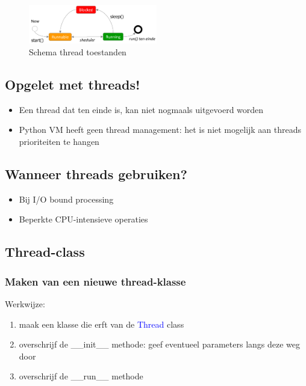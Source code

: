 \documentclass{article}
\begin{document}
\begin{figure}[H]
    \centering
    \includegraphics[width=0.5\textwidth]{thread-toestanden.png}
    \caption{Schema thread toestanden}
\end{figure}


\subsection{Opgelet met threads!}

\begin{itemize}
    \item Een thread dat ten einde is, kan niet nogmaals uitgevoerd worden
    \item Python VM heeft geen thread management: het is niet mogelijk aan threads prioriteiten te hangen
\end{itemize}

\subsection{Wanneer threads gebruiken?}

\begin{itemize}
    \item Bij I/O bound processing
    \item Beperkte CPU-intensieve operaties
\end{itemize}

\subsection{Thread-class}

\subsubsection{Maken van een nieuwe thread-klasse}

Werkwijze:

\begin{enumerate}
    \item maak een klasse die erft van de \textcolor{blue}{Thread} class
    \item overschrijf de \_\_init\_\_ methode: geef eventueel parameters langs deze weg door
    \item overschrijf de \_\_run\_\_ methode
\end{enumerate}
\end{document}
